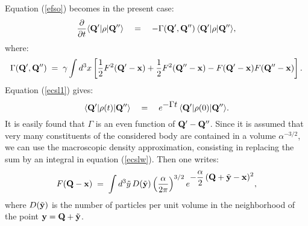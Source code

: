 \documentclass[10pt,a4paper]{article}
\begin{document}
Equation (\ref{efso}) becomes in the present case:
\begin{equation} \label{ecsl1}
\frac{\partial}{\partial t} \langle {\bf Q}'| \rho |{\bf Q}''
\rangle \quad = \quad - \Gamma ({\bf Q}',{\bf Q}'')\, \langle {\bf
Q}'| \rho |{\bf Q}'' \rangle,
\end{equation}
where:
\begin{equation} \label{Paaaqvl}
\Gamma ({\bf Q}',{\bf Q}'') \; = \; \gamma \int d^{3} x \left[
\frac{1}{2} F^{2} ({\bf Q}' - {\bf x}) +  \frac{1}{2} F^{2} ({\bf
Q}'' - {\bf x})  - F({\bf Q}' - {\bf x}) F({\bf Q}'' - {\bf x})
\right].
\end{equation}
Equation (\ref{ecsl1}) gives:
\begin{equation} \label{qwer}
\langle {\bf Q}'| \rho(t) |{\bf Q}'' \rangle \quad = \quad
e^{\displaystyle - \Gamma t}\, \langle {\bf Q}'| \rho(0) |{\bf
Q}'' \rangle.
\end{equation}
It is easily found that $\Gamma$ is an even function of ${\bf Q}'
- {\bf Q}''$. Since it is assumed that very many constituents of
the considered body are contained in a volume $\alpha^{-3/2}$, we
can use the macroscopic density approximation, consisting in
replacing the sum by an integral in equation (\ref{ecslw}). Then
one writes:
\begin{equation} \label{escl3}
F({\bf Q} - {\bf x}) \; = \; \int d^{3} \tilde{y}\, D(\tilde{\bf
y}) \left(\frac{\alpha}{2\pi}\right)^{3/2} e^{\displaystyle -
\frac{\alpha}{2}\, ({\bf Q} + \tilde{\bf y} - {\bf x})^{2}} ,
\end{equation}
where $D(\tilde{\bf y})$ is the number of particles per unit
volume in the neighborhood of the point ${\bf y} = {\bf Q} +
\tilde{\bf y}$.
\end{document}
